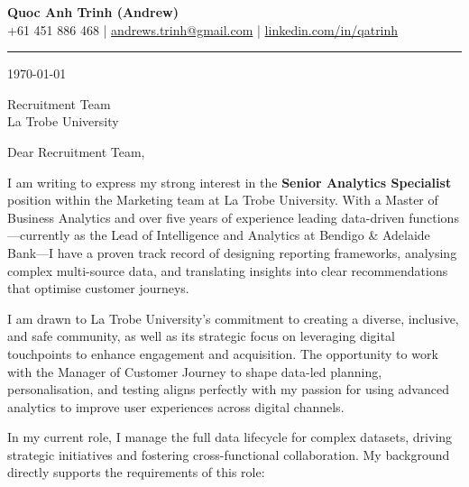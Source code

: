 \documentclass[11pt, a4paper]{article}
\begin{document}
\begin{center}
    {\LARGE \textbf{Quoc Anh Trinh (Andrew)}}\\[4pt]
    {\small
        +61 451 886 468 \quad|\quad
        \href{mailto:andrews.trinh@gmail.com}{andrews.trinh@gmail.com} \quad|\quad
        \href{https://www.linkedin.com/in/qatrinh}{linkedin.com/in/qatrinh}
    }
\end{center}

\vspace{4pt}
\hrule
\vspace{14pt}

\today

\vspace{8pt}

Recruitment Team\\
La Trobe University

\vspace{10pt}

Dear Recruitment Team,

I am writing to express my strong interest in the \textbf{Senior Analytics Specialist} position within the Marketing team at La Trobe University. With a Master of Business Analytics and over five years of experience leading data-driven functions—currently as the Lead of Intelligence and Analytics at Bendigo \& Adelaide Bank—I have a proven track record of designing reporting frameworks, analysing complex multi-source data, and translating insights into clear recommendations that optimise customer journeys.

I am drawn to La Trobe University's commitment to creating a diverse, inclusive, and safe community, as well as its strategic focus on leveraging digital touchpoints to enhance engagement and acquisition. The opportunity to work with the Manager of Customer Journey to shape data-led planning, personalisation, and testing aligns perfectly with my passion for using advanced analytics to improve user experiences across digital channels.

In my current role, I manage the full data lifecycle for complex datasets, driving strategic initiatives and fostering cross-functional collaboration. My background directly supports the requirements of this role:
\end{document}
